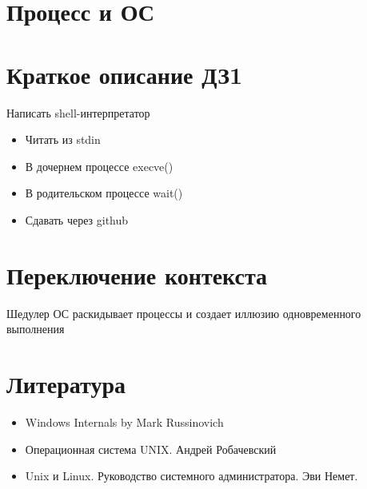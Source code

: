 \documentclass[../lectures.tex]{subfiles}
\begin{document}
\section{Процесс и ОС}

\section{Краткое описание ДЗ1} 
Написать shell-интерпретатор
\begin{itemize}
    \item Читать из stdin 
    \item В дочернем процессе execve()
    \item В родительском процессе wait()
    \item Сдавать через github
\end{itemize}

\section{Переключение контекста}
Шедулер ОС раскидывает процессы и создает иллюзию одновременного выполнения

\section{Литература}
\begin{itemize}
    \item Windows Internals by Mark Russinovich
    \item Операционная система UNIX. Андрей Робачевский
    \item Unix и Linux. Руководство системного администратора. Эви Немет.
\end{itemize}
\end{document}
